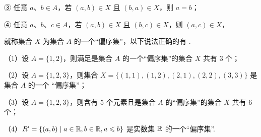 \documentclass[a4paper,11pt]{article}
\begin{document}
\begin{enumerate}
③ 任意 $a$、$b\in A$，若 $(a,b)\in X$ 且 $(b,a)\in X$，则 $a=b$；

④ 任意 $a$、$b$、$c\in A$，若 $(a,b)\in X$ 且 $(b,c)\in X$，则 $(a,c)\in X$，

就称集合 $X$ 为集合 $A$ 的一个“偏序集”，以下说法正确的有 \blankline[4.4em].

（1）设 $A=\{1,2\}$，则满足是集合 $A$ 的一个“偏序集”的集合 $X$ 共有 $3$ 个；

（2）设 $A=\{1,2,3\}$，则集合 $X=\{(1,1),(1,2),(2,1),(2,2),(3,3)\}$ 是集合 $A$ 的一个
“偏序集”；

（3）设 $A=\{1,2,3\}$，则含有 $5$ 个元素且是集合 $A$ 的“偏序集”的集合 $X$ 共有 $6$ 个；

（4）$R'=\{(a,b)\mid a\in\mathbb{R},b\in\mathbb{R},a\leqslant b\}$ 是实数集 $\mathbb{R}$ 的一个“偏序集”.

\ifanswer
\solbegin
{}
\solend

\fi

\end{enumerate}

\end{document}
